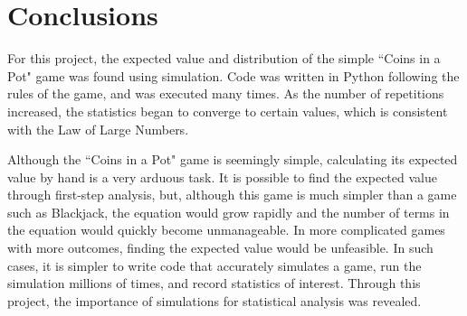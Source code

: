 \section{Conclusions}

For this project, the expected value and distribution of the simple ``Coins in a Pot" game was found using simulation. Code was written in Python following the rules of the game, and was executed many times. As the number of repetitions increased, the statistics began to converge to certain values, which is consistent with the Law of Large Numbers.

Although the ``Coins in a Pot" game is seemingly simple, calculating its expected value by hand is a very arduous task. It is possible to find the expected value through first-step analysis, but, although this game is much simpler than a game such as Blackjack, the equation would grow rapidly and the number of terms in the equation would quickly become unmanageable. In more complicated games with more outcomes, finding the expected value would be unfeasible. In such cases, it is simpler to write code that accurately simulates a game, run the simulation millions of times, and record statistics of interest. Through this project, the importance of simulations for statistical analysis was revealed.

